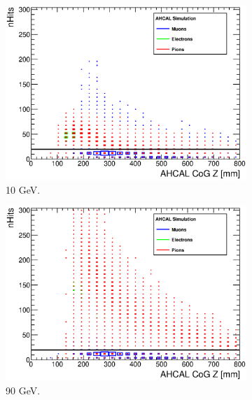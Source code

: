 \begin{figure}[htbp!]
	\hfill
	\begin{subfigure}[t]{0.49\textwidth}
		\centering
		\includegraphics[width=1\linewidth]{../Thesis_Plots/Timing/Pions/Plots/SelectionCut_nHitsCoGZ_10GeV.eps}
		\caption{10 GeV.} \label{fig:pi10GeV_nHitsCoGZ}
	\end{subfigure}
	\hfill
	\begin{subfigure}[t]{0.49\textwidth}
		\centering
		\includegraphics[width=1\linewidth]{../Thesis_Plots/Timing/Pions/Plots/SelectionCut_nHitsCoGZ_90GeV.eps}
		\caption{90 GeV.} \label{fig:pi90GeV_nHitsCoGZ}
	\end{subfigure}
	\hfill
	\begin{subfigure}[t]{0.49\textwidth}
		\centering

\end{subfigure}
\end{figure}
